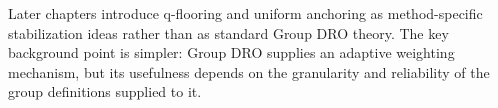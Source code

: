 Later chapters introduce q-flooring and uniform anchoring as method-specific stabilization ideas rather than as standard Group DRO theory. The key background point is simpler: Group DRO supplies an adaptive weighting mechanism, but its usefulness depends on the granularity and reliability of the group definitions supplied to it.
